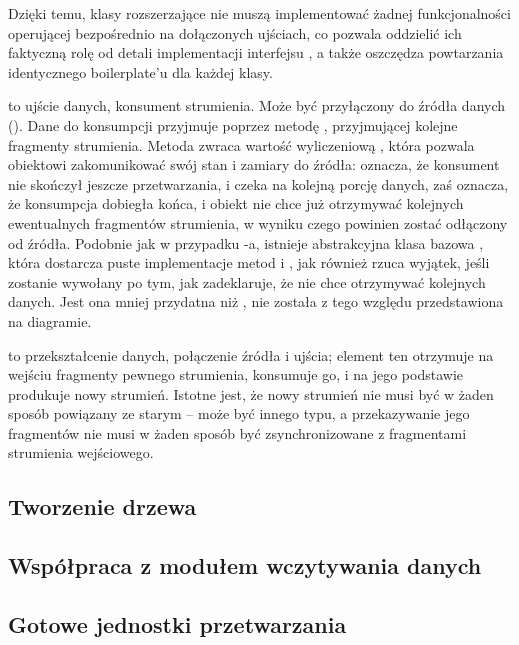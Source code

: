 Dzięki temu, klasy rozszerzające  nie muszą implementować żadnej
funkcjonalności operującej bezpośrednio na dołączonych ujściach, co pozwala oddzielić ich faktyczną
rolę od detali implementacji interfejsu , a także oszczędza powtarzania
identycznego boilerplate'u dla każdej klasy.


 to ujście danych, konsument strumienia. Może być przyłączony do źródła danych
(). Dane do konsumpcji przyjmuje poprzez metodę , przyjmującej kolejne
fragmenty strumienia. Metoda  zwraca wartość wyliczeniową , która pozwala
obiektowi zakomunikować swój stan i zamiary do źródła:  oznacza, że konsument nie
skończył jeszcze przetwarzania, i czeka na kolejną porcję danych, zaś  oznacza, że
konsumpcja dobiegła końca, i obiekt nie chce już otrzymywać kolejnych ewentualnych fragmentów
strumienia, w wyniku czego powinien zostać odłączony od źródła. Podobnie jak w przypadku
-a, istnieje abstrakcyjna klasa bazowa , która dostarcza
puste implementacje metod  i , jak również rzuca wyjątek, jeśli
 zostanie wywołany po tym, jak  zadeklaruje, że nie chce otrzymywać
kolejnych danych. Jest ona mniej przydatna niż , nie została z tego względu
przedstawiona na diagramie.


 to przekształcenie danych, połączenie źródła i ujścia; element ten otrzymuje na
wejściu fragmenty pewnego strumienia, konsumuje go, i na jego podstawie produkuje nowy strumień.
Istotne jest, że nowy strumień nie musi być w żaden sposób powiązany ze starym -- może być innego
typu, a przekazywanie jego fragmentów nie musi w żaden sposób być zsynchronizowane z fragmentami
strumienia wejściowego. 



\subsection{Tworzenie drzewa}


\subsection{Współpraca z modułem wczytywania danych}


\subsection{Gotowe jednostki przetwarzania}



